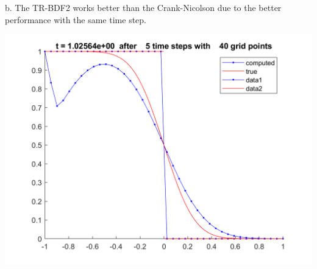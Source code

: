 \begin{solution}
    b. The TR-BDF2 works better than the Crank-Nicolson due to the better performance with the same time
    step.
    \begin{center}
        \includegraphics[scale=0.3]{3b.PNG}
    \end{center}

\end{solution}

\newpage

\newpage
